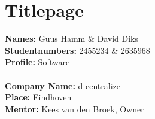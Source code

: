 \chapter{Titlepage}
\textbf {Names:}
Guus Hamm \& David Diks\\
\textbf{Studentnumbers:}
2455234 \& 2635968\\
\textbf{Profile:}
Software\\
\\
\textbf{Company Name:}
d-centralize\\
\textbf{Place:}
Eindhoven\\
\textbf{Mentor:}
Kees van den Broek, Owner